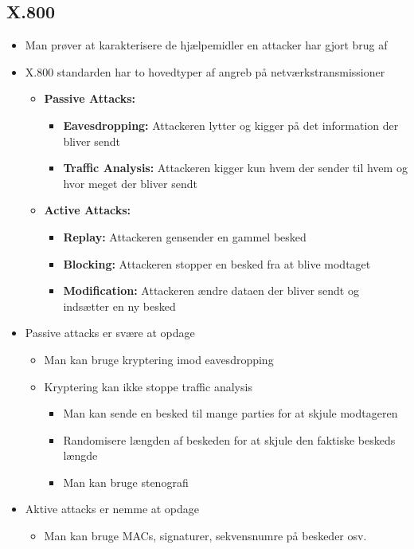 \documentclass[a4, english]{article}
\begin{document}
\subsection{X.800}
\begin{itemize}
	\item Man prøver at karakterisere de hjælpemidler en attacker har gjort brug af
  \item X.800 standarden har to hovedtyper af angreb på netværkstransmissioner  
  \begin{itemize}
  	\item \textbf{Passive Attacks:}
    \begin{itemize}
    	\item \textbf{Eavesdropping:} Attackeren lytter og kigger på det information der bliver sendt
      \item \textbf{Traffic Analysis:} Attackeren kigger kun hvem der sender til hvem og hvor meget der bliver sendt
    \end{itemize}
    \item \textbf{Active Attacks:}
    \begin{itemize}
    	\item \textbf{Replay:} Attackeren gensender en gammel besked
      \item \textbf{Blocking:} Attackeren stopper en besked fra at blive modtaget 
      \item \textbf{Modification:} Attackeren ændre dataen der bliver sendt og indsætter en ny besked
    \end{itemize}
  \end{itemize}
  \item Passive attacks er svære at opdage   
  \begin{itemize}
  	\item Man kan bruge kryptering imod eavesdropping
    \item Kryptering kan ikke stoppe traffic analysis
    \begin{itemize}
    	\item Man kan sende en besked til mange parties for at skjule modtageren
      \item Randomisere længden af beskeden for at skjule den faktiske beskeds længde 
      \item Man kan bruge stenografi
    \end{itemize}
  \end{itemize}
  \item Aktive attacks er nemme at opdage
  \begin{itemize}
    \item Man kan bruge MACs, signaturer, sekvensnumre på beskeder osv.
  \end{itemize}
\end{itemize} 
\end{document}
